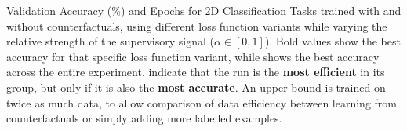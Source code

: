 \begin{table}[ht]
\centering
\caption{Validation Accuracy (\%) and Epochs for 2D Classification Tasks trained with and without counterfactuals, using different loss function variants while varying the relative strength of the supervisory signal ($\alpha \in [0,1] $). Bold values show the best accuracy for that specific loss function variant, while  shows the best accuracy across the entire experiment.  indicate that the run is the \textbf{most efficient} in its group, but \underline{only} if it is also the \textbf{most accurate}. An upper bound is trained on twice as much data, to allow comparison of data efficiency between learning from counterfactuals or simply adding more labelled examples.}  
\label{tab:results_alpha_variants}


\end{table}
